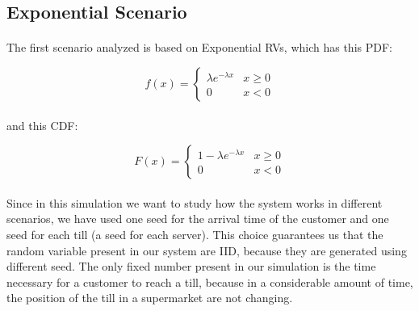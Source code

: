 \subsection{Exponential Scenario}
\paragraph{} The first scenario analyzed is based on Exponential RVs, which has this PDF:
\begin{centering}
\begin{equation}
f(x) = \begin{cases}
 \lambda e^{-\lambda x} &  x\geq 0 \\ 
 0 & x<0 
\end{cases}
\end{equation}
\end{centering}

\paragraph{} and this CDF:

\begin{centering}
\begin{equation}
F(x) = \begin{cases}
 1- \lambda e^{-\lambda x} &  x\geq 0 \\ 
 0 & x<0 
\end{cases}
\end{equation}
\end{centering}
\paragraph{} Since in this simulation we want to study how the system works in different scenarios, we have used one seed for the arrival time of the customer and one seed for each till (a seed for each server). This choice guarantees us that the random variable present in our system are IID, because they are generated using different seed.
The only fixed number present in our simulation is the time necessary for a customer to reach a till, because in a considerable amount of time, the position of the till in a supermarket are not changing.

